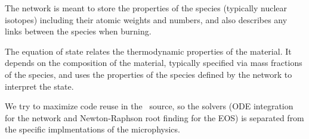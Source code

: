 The network is meant to store the properties of the species (typically
nuclear isotopes) including their atomic weights and numbers, and also
describes any links between the species when burning.

The equation of state relates the thermodynamic properties of the
material.  It depends on the composition of the material, typically
specified via mass fractions of the species, and uses the properties
of the species defined by the network to interpret the state.

We try to maximize code reuse in the \microphysics\ source, so the
solvers (ODE integration for the network and Newton-Raphson root
finding for the EOS) is separated from the specific implmentations of
the microphysics.
